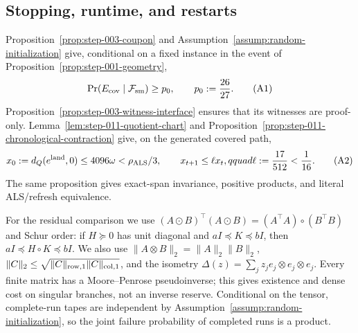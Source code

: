 \subsection{Stopping, runtime, and restarts}\label{app:step-012}

Proposition~\ref{prop:step-003-coupon} and
Assumption~\ref{assump:random-initialization} give, conditional on a fixed
instance in the event of Proposition~\ref{prop:step-001-geometry},
\[
\Pr(E_{\rm cov}\mid{\cal F}_{\rm sm})\ge p_0,
\qquad p_0:=\frac{26}{27}.
\tag{A1}
\]
Proposition~\ref{prop:step-003-witness-interface} ensures that its witnesses
are proof-only. Lemma~\ref{lem:step-011-quotient-chart} and
Proposition~\ref{prop:step-011-chronological-contraction} give, on the
generated covered path,
\[
x_0:=d_Q(e^{\rm land},0)\le4096\omega<\rho_{\rm ALS}/3,
\qquad x_{t+1}\le\ell x_t,qquad
\ell:=\frac{17}{512}<\frac1{16}.
\tag{A2}
\]
The same proposition gives exact-span invariance, positive products, and
literal ALS/refresh equivalence.

For the residual comparison we use
$(A\odot B)^\top(A\odot B)=(A^\top A)\circ(B^\top B)$ and Schur order:
if $H\succeq0$ has unit diagonal and $aI\preceq K\preceq bI$, then
$aI\preceq H\circ K\preceq bI$. We also use
$\|A\otimes B\|_2=\|A\|_2\|B\|_2$,
$\|C\|_2\le\sqrt{\|C\|_{\rm row,1}\|C\|_{\rm col,1}}$, and the isometry
$\Delta(z)=\sum_jz_je_j\otimes e_j\otimes e_j$. Every finite matrix has a
Moore--Penrose pseudoinverse; this gives existence and dense cost on singular
branches, not an inverse reserve. Conditional on the tensor, complete-run
tapes are independent by Assumption~\ref{assump:random-initialization}, so the
joint failure probability of completed runs is a product.

